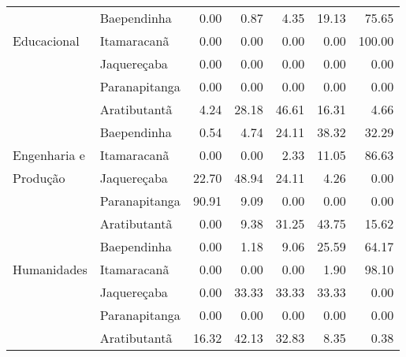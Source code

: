 \begin{table}[h]
\begin{tabular}{ll rrrrr}
                          & Baependinha             &               0.00 &         0.87 &        4.35 &      19.13 &            75.65 \\ 
   Educacional            & Itamaracanã             &               0.00 &         0.00 &        0.00 &       0.00 &           100.00 \\ 
                          & Jaquereçaba             &               0.00 &         0.00 &        0.00 &       0.00 &             0.00 \\ 
                          & Paranapitanga           &               0.00 &         0.00 &        0.00 &       0.00 &             0.00 \\ 
 \midrule{}
						  & Aratibutantã            &               4.24 &        28.18 &       46.61 &      16.31 &             4.66 \\ 
                          & Baependinha             &               0.54 &         4.74 &       24.11 &      38.32 &            32.29 \\ 
  Engenharia e            & Itamaracanã             &               0.00 &         0.00 &        2.33 &      11.05 &            86.63 \\ 
  Produção                & Jaquereçaba             &              22.70 &        48.94 &       24.11 &       4.26 &             0.00 \\ 
                          & Paranapitanga           &              90.91 &         9.09 &        0.00 &       0.00 &             0.00 \\ 
 \midrule{}
						  & Aratibutantã            &               0.00 &         9.38 &       31.25 &      43.75 &            15.62 \\ 
                          & Baependinha             &               0.00 &         1.18 &        9.06 &      25.59 &            64.17 \\ 
  Humanidades             & Itamaracanã             &               0.00 &         0.00 &        0.00 &       1.90 &            98.10 \\ 
                          & Jaquereçaba             &               0.00 &        33.33 &       33.33 &      33.33 &             0.00 \\ 
                          & Paranapitanga           &               0.00 &         0.00 &        0.00 &       0.00 &             0.00 \\ 
 \midrule{}
						  & Aratibutantã            &              16.32 &        42.13 &       32.83 &       8.35 &             0.38 \\ 

\end{tabular}
\end{table}
